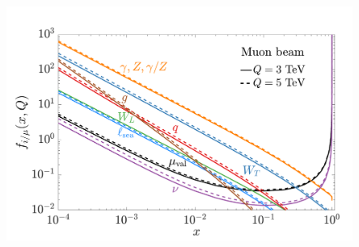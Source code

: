 \documentclass[aspectratio=169]{beamer}
\begin{document}
\begin{frame}
\begin{columns}
\begin{column}{0.45\textwidth}
		\includegraphics[width=0.85\textwidth]{figs/EWPDFm.pdf}
		\end{column}
	\end{columns}
\end{frame}
\end{document}
